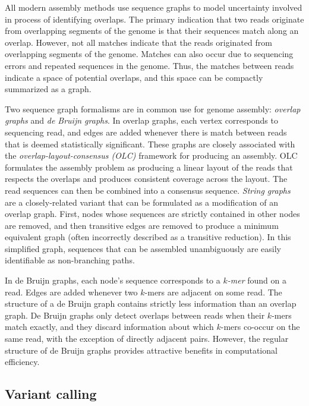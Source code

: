\documentclass[11pt]{ucthesis}
\begin{document}
All modern assembly methods use sequence graphs to model uncertainty involved in process of identifying overlaps. The primary indication that two reads originate from overlapping segments of the genome is that their sequences match along an overlap. However, not all matches indicate that the reads originated from overlapping segments of the genome. Matches can also occur due to sequencing errors and repeated sequences in the genome. Thus, the matches between reads indicate a space of potential overlaps, and this space can be compactly summarized as a graph. 

Two sequence graph formalisms are in common use for genome assembly: \emph{overlap graphs} and \emph{de Bruijn graphs}. In overlap graphs, each vertex corresponds to sequencing read, and edges are added whenever there is match between reads that is deemed statistically significant. These graphs are closely associated with the \emph{overlap-layout-consensus (OLC)} framework for producing an assembly\cite{myers1995toward}. OLC formulates the assembly problem as producing a linear layout of the reads that respects the overlaps and produces consistent coverage across the layout. The read sequences can then be combined into a consensus sequence. \emph{String graphs} are a closely-related variant that can be formulated as a modification of an overlap graph. First, nodes whose sequences are strictly contained in other nodes are removed, and then transitive edges are removed to produce a minimum equivalent graph (often incorrectly described as a transitive reduction)\cite{myers2005fragment}. In this simplified graph, sequences that can be assembled unambiguously are easily identifiable as non-branching paths. 

In de Bruijn graphs, each node's sequence corresponds to a $k$\emph{-mer} found on a read. Edges are added whenever two $k$-mers are adjacent on some read\cite{pevzner2001eulerian}. The structure of a de Bruijn graph contains strictly less information than an overlap graph. De Bruijn graphs only detect overlaps between reads when their $k$-mers match exactly, and they discard information about which $k$-mers co-occur on the same read, with the exception of directly adjacent pairs. However, the regular structure of de Bruijn graphs provides attractive benefits in computational efficiency.
 

\subsection{Variant calling}
\end{document}
